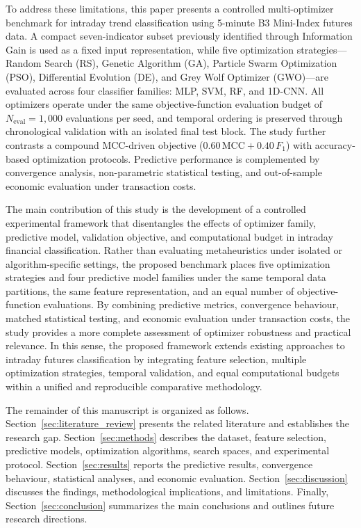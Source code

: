 To address these limitations, this paper presents a controlled multi-optimizer benchmark for intraday trend classification using 5-minute B3 Mini-Index futures data. A compact seven-indicator subset previously identified through Information Gain is used as a fixed input representation, while five optimization strategies---Random Search (RS), Genetic Algorithm (GA), Particle Swarm Optimization (PSO), Differential Evolution (DE), and Grey Wolf Optimizer (GWO)---are evaluated across four classifier families: MLP, SVM, RF, and 1D-CNN. All optimizers operate under the same objective-function evaluation budget of $N_{\mathrm{eval}} = 1{,}000$ evaluations per seed, and temporal ordering is preserved through chronological validation with an isolated final test block. The study further contrasts a compound MCC-driven objective ($0.60\,\mathrm{MCC} + 0.40\,F_1$) with accuracy-based optimization protocols. Predictive performance is complemented by convergence analysis, non-parametric statistical testing, and out-of-sample economic evaluation under transaction costs.

The main contribution of this study is the development of a controlled experimental framework that disentangles the effects of optimizer family, predictive model, validation objective, and computational budget in intraday financial classification. Rather than evaluating metaheuristics under isolated or algorithm-specific settings, the proposed benchmark places five optimization strategies and four predictive model families under the same temporal data partitions, the same feature representation, and an equal number of objective-function evaluations. By combining predictive metrics, convergence behaviour, matched statistical testing, and economic evaluation under transaction costs, the study provides a more complete assessment of optimizer robustness and practical relevance. In this sense, the proposed framework extends existing approaches to intraday futures classification by integrating feature selection, multiple optimization strategies, temporal validation, and equal computational budgets within a unified and reproducible comparative methodology.

The remainder of this manuscript is organized as follows. Section~\ref{sec:literature_review} presents the related literature and establishes the research gap. Section~\ref{sec:methods} describes the dataset, feature selection, predictive models, optimization algorithms, search spaces, and experimental protocol. Section~\ref{sec:results} reports the predictive results, convergence behaviour, statistical analyses, and economic evaluation. Section~\ref{sec:discussion} discusses the findings, methodological implications, and limitations. Finally, Section~\ref{sec:conclusion} summarizes the main conclusions and outlines future research directions.